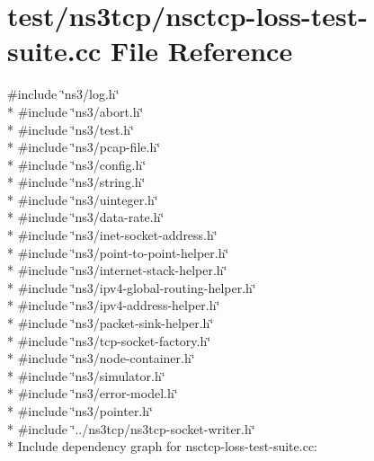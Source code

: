 \hypertarget{nsctcp-loss-test-suite_8cc}{}\section{test/ns3tcp/nsctcp-\/loss-\/test-\/suite.cc File Reference}
\label{nsctcp-loss-test-suite_8cc}
{\ttfamily \#include \char`\"{}ns3/log.\+h\char`\"{}}\\*
{\ttfamily \#include \char`\"{}ns3/abort.\+h\char`\"{}}\\*
{\ttfamily \#include \char`\"{}ns3/test.\+h\char`\"{}}\\*
{\ttfamily \#include \char`\"{}ns3/pcap-\/file.\+h\char`\"{}}\\*
{\ttfamily \#include \char`\"{}ns3/config.\+h\char`\"{}}\\*
{\ttfamily \#include \char`\"{}ns3/string.\+h\char`\"{}}\\*
{\ttfamily \#include \char`\"{}ns3/uinteger.\+h\char`\"{}}\\*
{\ttfamily \#include \char`\"{}ns3/data-\/rate.\+h\char`\"{}}\\*
{\ttfamily \#include \char`\"{}ns3/inet-\/socket-\/address.\+h\char`\"{}}\\*
{\ttfamily \#include \char`\"{}ns3/point-\/to-\/point-\/helper.\+h\char`\"{}}\\*
{\ttfamily \#include \char`\"{}ns3/internet-\/stack-\/helper.\+h\char`\"{}}\\*
{\ttfamily \#include \char`\"{}ns3/ipv4-\/global-\/routing-\/helper.\+h\char`\"{}}\\*
{\ttfamily \#include \char`\"{}ns3/ipv4-\/address-\/helper.\+h\char`\"{}}\\*
{\ttfamily \#include \char`\"{}ns3/packet-\/sink-\/helper.\+h\char`\"{}}\\*
{\ttfamily \#include \char`\"{}ns3/tcp-\/socket-\/factory.\+h\char`\"{}}\\*
{\ttfamily \#include \char`\"{}ns3/node-\/container.\+h\char`\"{}}\\*
{\ttfamily \#include \char`\"{}ns3/simulator.\+h\char`\"{}}\\*
{\ttfamily \#include \char`\"{}ns3/error-\/model.\+h\char`\"{}}\\*
{\ttfamily \#include \char`\"{}ns3/pointer.\+h\char`\"{}}\\*
{\ttfamily \#include \char`\"{}../ns3tcp/ns3tcp-\/socket-\/writer.\+h\char`\"{}}\\*
Include dependency graph for nsctcp-\/loss-\/test-\/suite.cc\+:
